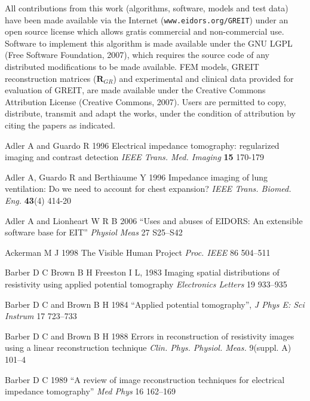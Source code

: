 \documentclass[12pt]{iopart}
\newcommand{\RB}{\mbox{$\mathbf{R}$}}
\begin{document}
All contributions from this work
(algorithms, software, models and test data)
 have been made available
via the Internet (\verb+www.eidors.org/GREIT+) 
under an open source license which allows
gratis commercial and non-commercial use.
Software to implement this algorithm is made
available under the GNU LGPL (Free Software Foundation, 2007),
which requires the source code of any distributed
 modifications to be made available.
FEM models, GREIT reconstruction matrices ($\RB_{GR}$) and
experimental and clinical data provided for evaluation of GREIT,
are made available under the Creative Commons Attribution
License (Creative Commons, 2007). Users are permitted
to copy, distribute, transmit and adapt the works,
under the condition of attribution by citing the
papers as indicated.



\References %
\item[]
Adler A and Guardo R 1996 Electrical impedance tomography:
regularized imaging and contrast detection {\em IEEE Trans. Med.
Imaging} {\bf 15} 170-179

\item[]
Adler A, Guardo R and Berthiaume Y 1996 Impedance imaging of lung
ventilation: Do we need to account for chest expansion? {\em IEEE
Trans. Biomed. Eng.} {\bf 43}(4) 414-20


\item[]
Adler A and Lionheart W R B 2006
``Uses and abuses of EIDORS: An extensible software base for EIT''
{\em Physiol Meas}
27 S25--S42

\item[]
Ackerman M J  1998  
The Visible Human Project
{\em Proc. IEEE}
86 504--511


\item[]
Barber D C
Brown B H
Freeston I L, 1983
Imaging spatial distributions of resistivity using applied potential tomography
{\em Electronics Letters}
19 933--935


\item[]
Barber D C and Brown B H 1984
``Applied potential tomography'', 
{\em J Phys E: Sci Instrum}
 17 723--733

\item[]
Barber D C and Brown B H 1988 Errors in reconstruction of
resistivity images using a linear reconstruction technique {\em
Clin. Phys. Physiol. Meas.} 
9(suppl. A) 101--4

\item[]
Barber D C 1989
``A review of image reconstruction techniques for electrical
 impedance tomography''
{\em Med Phys}
16 162--169
\end{document}
